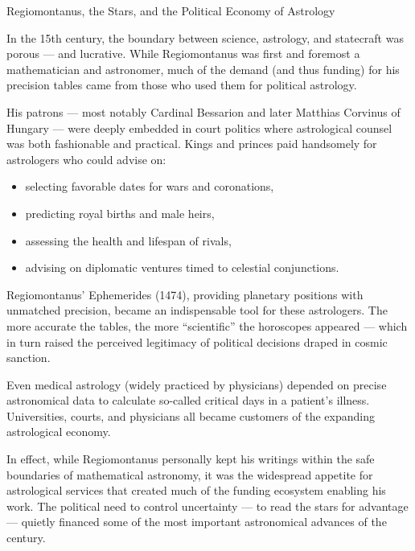 \begin{HistoricalSidebar}{Regiomontanus, the Stars, and the Political Economy of Astrology}

In the 15th century, the boundary between science, astrology, and statecraft was porous — and lucrative. While Regiomontanus was first and foremost a mathematician and astronomer, much of the demand (and thus funding) for his precision tables came from those who used them for political astrology.

\medskip

His patrons — most notably Cardinal Bessarion and later Matthias Corvinus of Hungary — were deeply embedded in court politics where astrological counsel was both fashionable and practical. Kings and princes paid handsomely for astrologers who could advise on:

\medskip

\begin{itemize}

  \item selecting favorable dates for wars and coronations,

  \item predicting royal births and male heirs,

  \item assessing the health and lifespan of rivals,

  \item advising on diplomatic ventures timed to celestial conjunctions.

\end{itemize}

\medskip

Regiomontanus' Ephemerides (1474), providing planetary positions with unmatched precision, became an indispensable tool for these astrologers. The more accurate the tables, the more “scientific” the horoscopes appeared — which in turn raised the perceived legitimacy of political decisions draped in cosmic sanction.

\medskip

Even medical astrology (widely practiced by physicians) depended on precise astronomical data to calculate so-called critical days in a patient’s illness. Universities, courts, and physicians all became customers of the expanding astrological economy.

\medskip

In effect, while Regiomontanus personally kept his writings within the safe boundaries of mathematical astronomy, it was the widespread appetite for astrological services that created much of the funding ecosystem enabling his work. The political need to control uncertainty — to read the stars for advantage — quietly financed some of the most important astronomical advances of the century.

\end{HistoricalSidebar}



